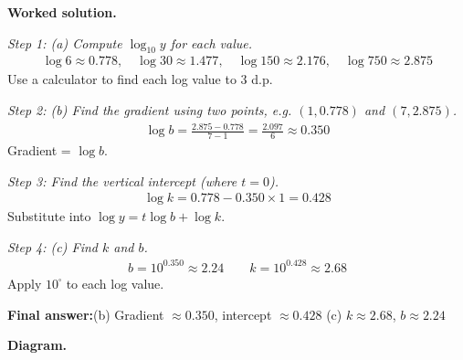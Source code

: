 \documentclass[11pt]{article}
\begin{document}
\textbf{Worked solution.}

\textit{Step 1: (a) Compute \( \log_{10} y \) for each value.}
\[\begin{gathered}
\log 6 \approx 0.778, \quad \log 30 \approx 1.477, \quad \log 150 \approx 2.176, \quad \log 750 \approx 2.875
\end{gathered}\]
Use a calculator to find each log value to 3 d.p.

\textit{Step 2: (b) Find the gradient using two points, e.g. \( (1, 0.778) \) and \( (7, 2.875) \).}
\[\begin{gathered}
\log b = \frac{2.875 - 0.778}{7 - 1} = \frac{2.097}{6} \approx 0.350
\end{gathered}\]
Gradient = \( \log b \).

\textit{Step 3: Find the vertical intercept (where \( t = 0 \)).}
\[\begin{gathered}
\log k = 0.778 - 0.350 \times 1 = 0.428
\end{gathered}\]
Substitute into \( \log y = t\log b + \log k \).

\textit{Step 4: (c) Find \( k \) and \( b \).}
\[\begin{gathered}
b = 10^{0.350} \approx 2.24 \qquad k = 10^{0.428} \approx 2.68
\end{gathered}\]
Apply \( 10^{\square} \) to each log value.

\begin{answerbox}
\textbf{Final answer:}\quad (b) Gradient \(\displaystyle  \approx 0.350 \), intercept \(\displaystyle  \approx 0.428 \) \quad  (c) \(\displaystyle  k \approx 2.68 \), \(\displaystyle  b \approx 2.24 \)
\end{answerbox}
\textbf{Diagram.}
\end{document}
